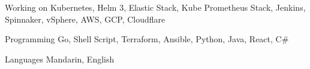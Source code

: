 

\begin{cvskills}

  \cvskill
    {Working on} %
    {Kubernetes, Helm 3, Elastic Stack, Kube Prometheus Stack, Jenkins, Spinnaker, vSphere, AWS, GCP, Cloudflare} %

  \cvskill
    {Programming} %
    {Go, Shell Script, Terraform, Ansible, Python, Java, React, C\#} %

  \cvskill
    {Languages} %
    {Mandarin, English} %

\end{cvskills}
